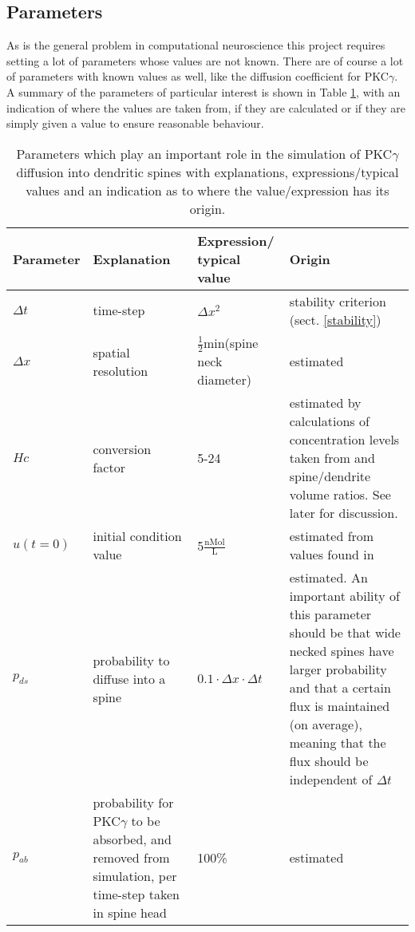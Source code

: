 \subsection{Parameters}

As is the general problem in computational neuroscience this project requires setting a lot of parameters whose values are not known. 
There are of course a lot of parameters with known values as well, like the diffusion coefficient for PKC$\gamma$. 
A summary of the parameters of particular interest is shown in Table \ref{table:parameters}, with an indication of where the values are taken from, if they are calculated or if they are simply given a value to ensure reasonable behaviour.

\begin{table}[H]
\centering
\begin{tabular}{|p{}|p{}|p{}|p{}|}
\hline
\textbf{Parameter} & \textbf{Explanation} &\textbf{Expression/ typical value}& \textbf{Origin} \\
\hline
$\Delta t$ & time-step & $\Delta x^2$ & stability criterion (sect. \ref{stability}) \\
\hline
$\Delta x$ & spatial resolution & $\frac{1}{2}$min(spine neck diameter) & estimated \\
\hline
$Hc$ & conversion factor & 5-24 & estimated by calculations of concentration levels taken from \cite{light1996protein} and spine/dendrite volume ratios. See later for discussion. \\
\hline
$u(t=0)$ & initial condition value & 5$\frac{\text{nMol}}{\text{L}}$ & estimated from values found in \cite{light1996protein}\\
\hline
$p_{ds}$ & probability to diffuse into a spine & $0.1\cdot\Delta x\cdot\Delta t$& estimated. An important ability of this parameter should be that wide necked spines have larger probability and that a certain flux is maintained (on average), meaning that the flux should be independent of $\Delta t$ \\
\hline
$p_{ab}$ & probability for PKC$\gamma$ to be absorbed, and removed from simulation, per time-step taken in spine head & 100\% & estimated\\
\hline
\end{tabular}
\caption[Important parameters]{Parameters which play an important role in the simulation of PKC$\gamma$ diffusion into dendritic spines with explanations, expressions/typical values and an indication as to where the value/expression has its origin.}
\label{table:parameters}
\end{table}

